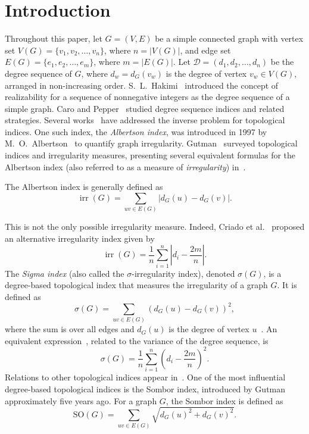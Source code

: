 \documentclass[12pt, a4paper]{article}
\newcommand{\SO}{\mathrm{SO}}
\begin{document}
\section{Introduction}
Throughout this paper, let $G=(V,E)$ be a simple connected graph with vertex set $V(G) = \{v_1, v_2, \dots, v_n\}$, where $n = |V(G)|$, and edge set $E(G) = \{e_1, e_2, \dots, e_m\}$, where $m = |E(G)|$. Let $\mathscr{D} = (d_1, d_2, \dots, d_n)$ be the degree sequence of $G$, where $d_w = d_G(v_w)$ is the degree of vertex $v_w \in V(G)$, arranged in non-increasing order. S.~L.~Hakimi~\cite{Hakimi1962} introduced the concept of realizability for a sequence of nonnegative integers as the degree sequence of a simple graph. 
Caro and Pepper~\cite{Caro2014Pepper} studied degree sequence indices and related strategies.
Several works~\cite{Schmidt1976Druffel,Baskin1987Gordeeva} have addressed the inverse problem for topological indices. One such index, the \emph{Albertson index}, was introduced in 1997 by M.~O.~Albertson~\cite{albertson1997irregularity} to quantify graph irregularity. Gutman~\cite{Gutman2018I} surveyed topological indices and irregularity measures, presenting several equivalent formulas for the Albertson index (also referred to as a measure of \emph{irregularity}) in~\cite{abdo2014total,Abdo2018Dimitrov,Albalahi2023Alanazi,Alex2024Indulal,Akg2019Naca,Arif2023Hayat}.

The Albertson index is generally defined as
$$
\operatorname{irr}(G) = \sum_{uv \in E(G)} |d_G(u) - d_G(v)|.
$$

This is not the only possible irregularity measure. Indeed, Criado et al.~\cite{Criado2014Flores} proposed an alternative irregularity index given by
$$
\operatorname{irr}(G) = \frac{1}{n} \sum_{i=1}^{n} \left| d_i - \frac{2m}{n} \right|.
$$
The \textit{Sigma index} (also called the $\sigma$-irregularity index), denoted $\sigma(G)$, is a degree-based topological index that measures the irregularity of a graph $G$. It is defined as
$$
\sigma(G)=\sum_{uv \in E(G)} (d_G(u)-d_G(v))^2,
$$
where the sum is over all edges and $d_G(u)$ is the degree of vertex $u$~\cite{Abdo2015Dimitrov,gutman2018inverse}.
An equivalent expression~\cite{Criado2014Flores}, related to the variance of the degree sequence, is
$$
\sigma(G) = \frac{1}{n} \sum_{i=1}^n \left( d_i - \frac{2m}{n} \right)^2.
$$
Relations to other topological indices appear in~\cite{Jahanbai2021Sheikholeslami}.
One of the most influential degree-based topological indices is the Sombor index, introduced by Gutman~\cite{Gutman2021Geo} approximately five years ago. For a graph $G$, the Sombor index is defined as
\[
\SO(G)=\sum_{uv\in E(G)}\sqrt{d_G(u)^2+d_G(v)^2}.
\]
\end{document}
